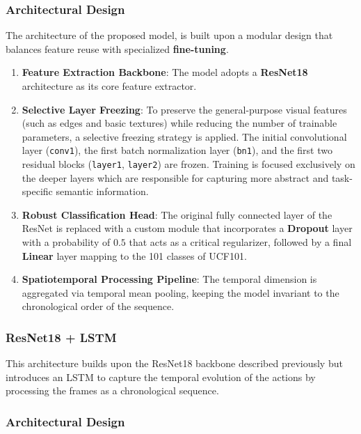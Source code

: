 \subsubsection*{Architectural Design}

The architecture of the proposed model, is built upon a modular design that balances feature reuse with specialized \textbf{fine-tuning}.
\begin{enumerate} 
    \item \textbf{Feature Extraction Backbone}: The model adopts a \textbf{ResNet18} architecture as its core feature extractor. 
    \item \textbf{Selective Layer Freezing}: To preserve the general-purpose visual features (such as edges and basic textures) while reducing the number of trainable parameters, a selective freezing strategy is applied. The initial convolutional layer (\texttt{conv1}), the first batch normalization layer (\texttt{bn1}), and the first two residual blocks (\texttt{layer1}, \texttt{layer2}) are frozen. Training is focused exclusively on the deeper layers which are responsible for capturing more abstract and task-specific semantic information.
    \item \textbf{Robust Classification Head}: The original fully connected layer of the ResNet is replaced with a custom module that incorporates a \textbf{Dropout} layer with a probability of $0.5$ that acts as a critical regularizer, followed by a final \textbf{Linear} layer mapping to the 101 classes of UCF101. 
    \item \textbf{Spatiotemporal Processing Pipeline}: The temporal dimension is aggregated via temporal mean pooling, keeping the model invariant to the chronological order of the sequence. 
\end{enumerate}

\subsubsection{ResNet18 + LSTM}
This architecture builds upon the ResNet18 backbone described previously but introduces an LSTM to capture the temporal evolution of the actions by processing the frames as a chronological sequence.

\subsubsection*{Architectural Design}

